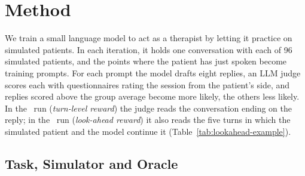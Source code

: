 \section{Method}
\label{sec:method}

We train a small language model to act as a therapist by letting it practice on simulated
patients. In each iteration, it holds one conversation with each of 96 simulated patients,
and the points where the patient has just spoken become training prompts. For each prompt the
model drafts eight replies, an LLM judge scores each with questionnaires rating the session from
the patient's side, and replies scored above the group average become more likely, the others less
likely. In the \Kz\ run (\emph{turn-level reward}) the judge reads the conversation ending on the
reply; in the \Kf\ run (\emph{look-ahead reward}) it also reads the five turns in which the
simulated patient and the model continue it (Table~\ref{tab:lookahead-example}).

\subsection{Task, Simulator and Oracle}
\label{sec:task}

